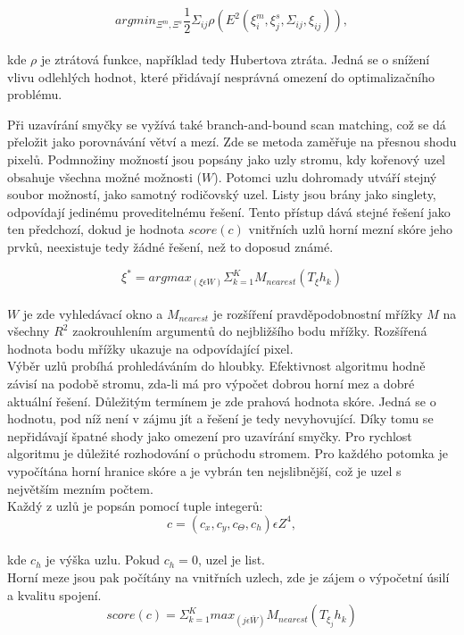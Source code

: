 \documentclass[12pt]{article}
\begin{document}
\begin{equation}
	argmin_{\Xi^m,\Xi^s}\frac{1}{2}\Sigma_{ij}\rho(E^2(\xi_i^m,\xi_j^s,\Sigma_{ij},\xi_{ij})),
\end{equation}\\
kde $\rho$ je ztrátová funkce, například tedy Hubertova ztráta. Jedná se o snížení vlivu odlehlých hodnot, které přidávají nesprávná omezení do optimalizačního problému.

\indent Při uzavírání smyčky se vyžívá také branch-and-bound scan matching, což se dá přeložit jako porovnávání větví a mezí. Zde se metoda zaměřuje na přesnou shodu pixelů. Podmnožiny možností jsou popsány jako uzly stromu, kdy kořenový uzel obsahuje všechna možné možnosti ($W$). Potomci uzlu dohromady utváří stejný soubor možností, jako samotný rodičovský uzel. Listy jsou brány jako singlety, odpovídají jedinému proveditelnému řešení. Tento přístup dává stejné řešení jako ten předchozí, dokud je hodnota $score(c)$ vnitřních uzlů horní mezní skóre jeho prvků, neexistuje tedy žádné řešení, než to doposud známé.

\begin{equation}
	\xi^*=argmax_{(\xi\epsilon W)}\Sigma_{k=1}^KM_{nearest}(T_{\xi}h_k)
\end{equation}\\
$W$ je zde vyhledávací okno a $M_{nearest}$ je rozšíření pravděpodobnostní mřížky $M$ na všechny $R^2$ zaokrouhlením argumentů do nejbližšího bodu mřížky. Rozšířená hodnota bodu mřížky ukazuje na odpovídající pixel.\\
\indent Výběr uzlů probíhá prohledáváním do hloubky. Efektivnost algoritmu hodně závisí na podobě stromu, zda-li má pro výpočet dobrou horní mez a dobré aktuální řešení. Důležitým termínem je zde prahová hodnota skóre. Jedná se o hodnotu, pod níž není v zájmu jít a řešení je tedy nevyhovující. Díky tomu se nepřidávají špatné shody jako omezení pro uzavírání smyčky. Pro rychlost algoritmu je důležité rozhodování o průchodu stromem. Pro každého potomka je vypočítána horní hranice skóre a je vybrán ten nejslibnější, což je uzel s největším mezním počtem.\\
\indent Každý z uzlů je popsán pomocí tuple integerů: 
\begin{equation}
	c=(c_x,c_y,c_\Theta,c_h)\epsilon Z^4,
\end{equation}\\
kde $c_h$ je výška uzlu. Pokud $c_h=0$, uzel je list.\\
\indent Horní meze jsou pak počítány na vnitřních uzlech, zde je zájem o výpočetní úsilí a kvalitu spojení. 
\begin{equation}
	score(c)=\Sigma_{k=1}^Kmax_{(j\epsilon \bar{W})}M_{nearest}(T_{\xi_j}h_k)
\end{equation}
\end{document}
